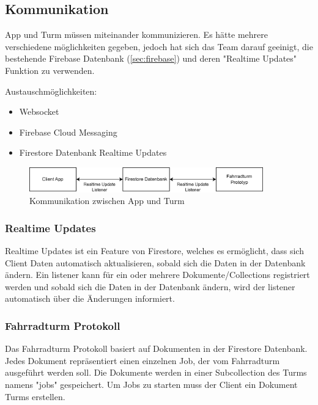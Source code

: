 \subsection{Kommunikation}

App und Turm müssen miteinander kommunizieren. Es hätte mehrere verschiedene möglichkeiten gegeben, jedoch hat sich das Team darauf geeinigt, die bestehende Firebase Datenbank (\ref{sec:firebase}) und deren "Realtime Updates" Funktion zu verwenden.

Austauschmöglichkeiten:
\begin{itemize}
  \item Websocket
  \item Firebase Cloud Messaging
  \item Firestore Datenbank Realtime Updates
\end{itemize}

\begin{figure}[H]
  \centering
  \includegraphics[width=0.9\textwidth]{images/kommunikation.png}
  \caption{Kommunikation zwischen App und Turm}
  \label{fig:kommunikation}
\end{figure}

\subsubsection{Realtime Updates}

Realtime Updates ist ein Feature von Firestore, welches es ermöglicht, dass sich Client Daten automatisch aktualisieren, sobald sich die Daten in der Datenbank ändern. Ein \Gls{listener} kann für ein oder mehrere Dokumente/Collections registriert werden und sobald sich die Daten in der Datenbank ändern, wird der \Gls{listener} automatisch über die Änderungen informiert.

\subsubsection{Fahrradturm Protokoll}

Das Fahrradturm Protokoll basiert auf Dokumenten in der Firestore Datenbank. Jedes Dokument repräsentiert einen einzelnen Job, der vom Fahrradturm ausgeführt werden soll. Die Dokumente werden in einer Subcollection des Turms namens "jobs" gespeichert. Um Jobs zu starten muss der Client ein Dokument Turms erstellen.

